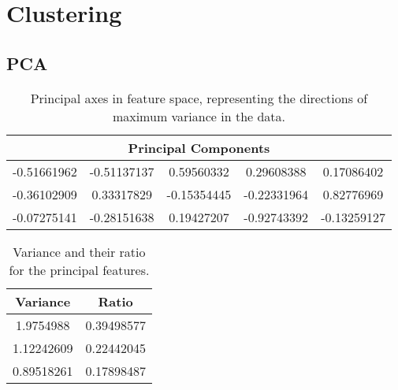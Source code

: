 %


\section{Clustering}

\subsection{PCA}

\begin{table}
	\begin{tabular}{ c c c c c }
		\hline
		\multicolumn{5}{c}{Principal Components} \\ \hline
		-0.51661962 & -0.51137137 &  0.59560332 &  0.29608388 &  0.17086402 \\ \hline
		-0.36102909 &  0.33317829 & -0.15354445 & -0.22331964 &  0.82776969 \\ \hline
		-0.07275141 & -0.28151638 &  0.19427207 & -0.92743392 & -0.13259127 \\ \hline
	\end{tabular}
	\caption{Principal axes in feature space, representing the directions of maximum variance in the data.}
	\label{tab:pca_components}
\end{table}

\begin{table}
	\begin{center}
		\begin{tabular}{cc}
			\hline
			Variance & Ratio \\ \hline
			1.9754988 & 0.39498577 \\
			1.12242609 & 0.22442045 \\
			0.89518261 & 0.17898487 \\
			\hline
		\end{tabular}
		\caption{Variance and their ratio for the principal features.}
		\label{tab:pca_variance}
	\end{center}
\end{table}

